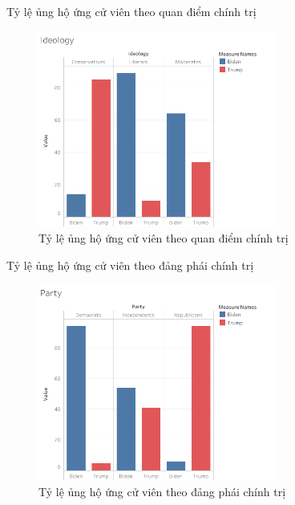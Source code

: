 \documentclass[10pt]{beamer}
\theoremstyle{remark}
\theoremstyle{definition}
\begin{document}
\begin{frame}{Tỷ lệ ủng hộ ứng cử viên theo quan điểm chính trị}
	\begin{figure}[h!]
        \centering
        \includegraphics[width=0.7\textwidth]{figures/Ideology.png}
        \caption{Tỷ lệ ủng hộ ứng cử viên theo quan điểm chính trị}
    \end{figure}
\end{frame}


\begin{frame}{Tỷ lệ ủng hộ ứng cử viên theo đảng phái chính trị}
	\begin{figure}[h!]
        \centering
        \includegraphics[width=0.7\textwidth]{figures/Party.png}
        \caption{Tỷ lệ ủng hộ ứng cử viên theo đảng phái chính trị}
    \end{figure}
\end{frame}
\end{document}
